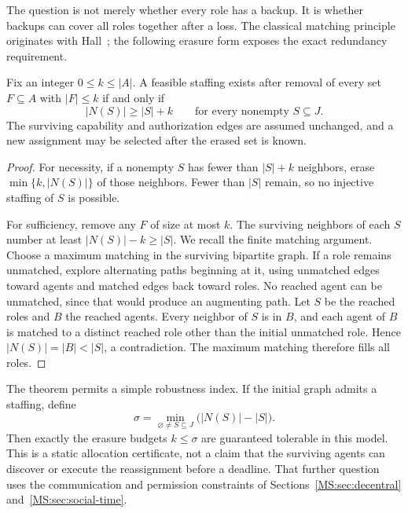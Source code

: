The question is not merely whether every role has a backup. It is whether backups can cover all roles together after a loss. The classical matching principle originates with Hall~\cite{MS:hall1935}; the following erasure form exposes the exact redundancy requirement.

\begin{MStheorem}\label{MS:thm:robust-staffing}
Fix an integer $0\leq k\leq |A|$. A feasible staffing exists after removal of every set $F\subseteq A$ with $|F|\leq k$ if and only if
\begin{equation}\label{MS:eq:robust-hall}
|N(S)|\geq |S|+k
\qquad\text{for every nonempty }S\subseteq J.
\end{equation}
The surviving capability and authorization edges are assumed unchanged, and a new assignment may be selected after the erased set is known.
\end{MStheorem}
\begin{proof}
For necessity, if a nonempty $S$ has fewer than $|S|+k$ neighbors, erase $\min\{k,|N(S)|\}$ of those neighbors. Fewer than $|S|$ remain, so no injective staffing of $S$ is possible.

For sufficiency, remove any $F$ of size at most $k$. The surviving neighbors of each $S$ number at least $|N(S)|-k\geq|S|$. We recall the finite matching argument. Choose a maximum matching in the surviving bipartite graph. If a role remains unmatched, explore alternating paths beginning at it, using unmatched edges toward agents and matched edges back toward roles. No reached agent can be unmatched, since that would produce an augmenting path. Let $S$ be the reached roles and $B$ the reached agents. Every neighbor of $S$ is in $B$, and each agent of $B$ is matched to a distinct reached role other than the initial unmatched role. Hence $|N(S)|=|B|<|S|$, a contradiction. The maximum matching therefore fills all roles.
\end{proof}

The theorem permits a simple robustness index. If the initial graph admits a staffing, define
\[
\sigma=\min_{\varnothing\ne S\subseteq J}\bigl(|N(S)|-|S|\bigr).
\]
Then exactly the erasure budgets $k\leq\sigma$ are guaranteed tolerable in this model. This is a static allocation certificate, not a claim that the surviving agents can discover or execute the reassignment before a deadline. That further question uses the communication and permission constraints of Sections~\ref{MS:sec:decentral} and~\ref{MS:sec:social-time}.

